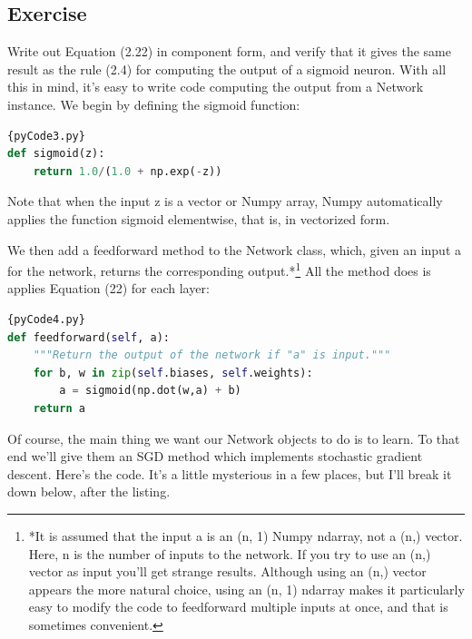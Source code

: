 \documentclass[a4paper,12pt]{report}%
\begin{document}
\subsection{Exercise}
Write out Equation (2.22) in component form, and verify that it gives the same result as the rule (2.4) for computing the output of a sigmoid neuron.
With all this in mind, it's easy to write code computing the output from a Network instance. We begin by defining the sigmoid function:

\begin{lstlisting}[language=Python,breaklines,basicstyle=\footnotesize\ttfamily]{pyCode3.py}
def sigmoid(z):
    return 1.0/(1.0 + np.exp(-z))
\end{lstlisting}

Note that when the input z is a vector or Numpy array, Numpy automatically applies the function sigmoid elementwise, that is, in vectorized form.

We then add a feedforward method to the Network class, which, given an input a for the network, returns the corresponding output.*\footnote{\color{blue}*It is assumed that the input a is an (n, 1) Numpy ndarray, not a (n,) vector. Here, n is the number of inputs to the network. If you try to use an (n,) vector as input you'll get strange results. Although using an (n,) vector appears the more natural choice, using an (n, 1) ndarray makes it particularly easy to modify the code to feedforward multiple inputs at once, and that is sometimes convenient.} All the method does is applies Equation (22) for each layer:

\begin{lstlisting}[language=Python,breaklines,basicstyle=\footnotesize\ttfamily]{pyCode4.py}
def feedforward(self, a):
    """Return the output of the network if "a" is input."""
    for b, w in zip(self.biases, self.weights):
        a = sigmoid(np.dot(w,a) + b)
    return a
\end{lstlisting}

Of course, the main thing we want our Network objects to do is to learn. To that end we'll give them an SGD method which implements stochastic gradient descent. Here's the code. It's a little mysterious in a few places, but I'll break it down below, after the listing.
\end{document}
